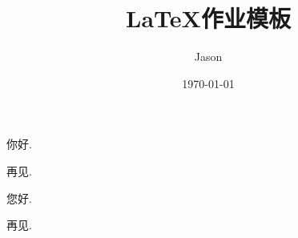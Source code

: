 \documentclass[12pt, chinese, lineno, watermark]{assignment}
\title{\LaTeX 作业模板}
\author{Jason}
\date{\today}
\institute{同济大学数学科学学院}
\begin{document}
    \maketitle

    你好.

    再见.

    \clearpage

    您好.

    再见.


\end{document}
